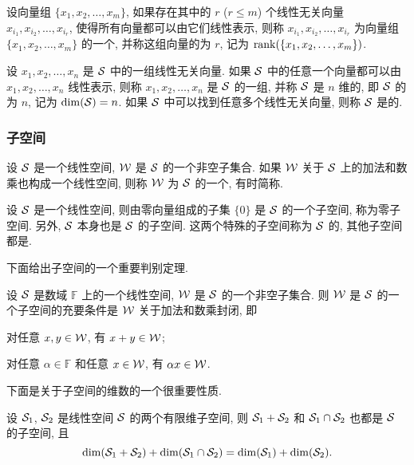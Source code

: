 设向量组 $\{x_1, x_2, \ldots, x_m\}$,
如果存在其中的 $r$ ($r\leq m$) 个线性无关向量 $x_{i_1},x_{i_2},\ldots,x_{i_r}$,
使得所有向量都可以由它们线性表示,
则称 $x_{i_1},x_{i_2},\ldots,x_{i_r}$ 为向量组
$\{x_1, x_2, \ldots, x_m\}$ 的一个,
并称这组向量的为 $r$, 记为
$\operatorname{rank}(\{x_1, x_2, \ldots, x_m\})$.

设 $x_1, x_2, \ldots, x_n$ 是 $\mathcal{S}$ 中的一组线性无关向量.
如果 $\mathcal{S}$ 中的任意一个向量都可以由 $x_1, x_2, \ldots, x_n$ 线性表示,
则称 $x_1, x_2, \ldots, x_n$ 是 $\mathcal{S}$ 的一组,
并称 $\mathcal{S}$ 是 $n$ 维的, 即 $\mathcal{S}$ 的为 $n$, 记为 $\dim(\mathcal{S})=n$.
如果 $\mathcal{S}$ 中可以找到任意多个线性无关向量, 则称 $\mathcal{S}$ 是的.


\subsubsection{子空间}
设 $\mathcal{S}$ 是一个线性空间, $\mathcal{W}$ 是 $\mathcal{S}$ 的一个非空子集合.
如果 $\mathcal{W}$ 关于 $\mathcal{S}$ 上的加法和数乘也构成一个线性空间,
则称 $\mathcal{W}$ 为 $\mathcal{S}$ 的一个,
有时简称.


\begin{example}
	设 $\mathcal{S}$ 是一个线性空间, 则由零向量组成的子集 $\{0\}$
	是 $\mathcal{S}$ 的一个子空间, 称为零子空间.
	另外, $\mathcal{S}$ 本身也是 $\mathcal{S}$ 的子空间.
	这两个特殊的子空间称为 $\mathcal{S}$ 的,
	其他子空间都是.
\end{example}
%
下面给出子空间的一个重要判别定理.
\begin{theorem}
	设 $\mathcal{S}$ 是数域 $\mathbb{F}$ 上的一个线性空间,
	$\mathcal{W}$ 是 $\mathcal{S}$ 的一个非空子集合.
	则 $\mathcal{W}$ 是 $\mathcal{S}$ 的一个子空间的充要条件是 $\mathcal{W}$
	关于加法和数乘封闭, 即
	\begin{nlist}
		\item 对任意 $x,y\in\mathcal{W}$, 有 $x+y\in\mathcal{W}$;
		\item 对任意 $\alpha\in\mathbb{F}$ 和任意 $x\in\mathcal{W}$,
		有 $\alpha x\in\mathcal{W}$.
	\end{nlist}
\end{theorem}
%
下面是关于子空间的维数的一个很重要性质.
\begin{theorem}
	设 $\mathcal{S}_1$, $\mathcal{S}_2$ 是线性空间 $\mathcal{S}$ 的两个有限维子空间,
	则 $\mathcal{S}_1+\mathcal{S}_2$ 和 $\mathcal{S}_1\cap\mathcal{S}_2$ 也都是 $\mathcal{S}$ 的子空间, 且
	$$
	\dim(\mathcal{S}_1+\mathcal{S}_2) + \dim(\mathcal{S}_1\cap\mathcal{S}_2)
	= \dim(\mathcal{S}_1) + \dim(\mathcal{S}_2).
	$$
\end{theorem}



